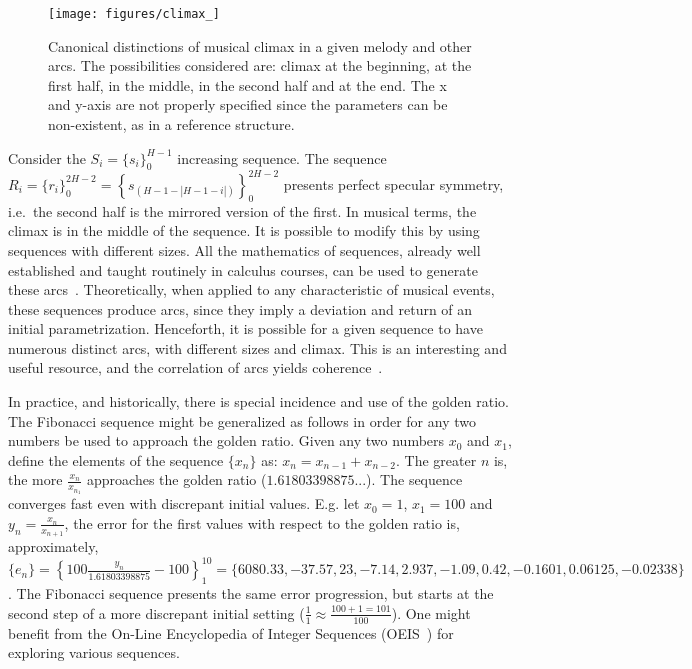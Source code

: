 \begin{figure}
    \centering
        \texttt{[image: figures/climax\_]}
        \caption{Canonical distinctions of musical climax in a given melody and
        other arcs. The possibilities considered are: climax at the beginning, at the first half, in the middle, in the second half and 
        at the end. The x and y-axis are not properly specified since the parameters can be non-existent, as in a reference structure.}
        \label{fig:climax}
\end{figure}

Consider the $S_i=\{s_i\}_0^{H-1}$ increasing sequence. The sequence
$R_i=\{r_i\}_0^{2H -2}=\left\{s_{(H-1-|H-1-i|)}\right\}_0^{2H-2}$
presents perfect specular symmetry, i.e.\ the second half is the
mirrored version of the first. In musical terms, the climax is
in the middle of the sequence. It is possible to modify this
by using sequences with different sizes. All the mathematics of
sequences, already well established and taught routinely in calculus courses, can be used to generate these arcs~\cite{Guidorizzo,Schoenberg}.
Theoretically, when applied to any characteristic of musical events,
these sequences produce arcs, since they imply a deviation and return of an initial parametrization.
Henceforth, it is possible for a given sequence to have
numerous distinct arcs, with different sizes and climax. 
This is an interesting and useful resource, and the correlation of arcs yields coherence~\cite{Salzer}.

In practice, and historically, there is special incidence and use of the golden ratio.
The Fibonacci sequence might be generalized as follows in order for any two numbers be used
to approach the golden ratio.
Given any two numbers $x_0$
and $x_1$, define the elements of the sequence $\{x_n\}$ as: $x_n=x_{n-1}+x_{n-2}$.
The greater $n$ is, the more $\frac{x_{n}}{x_{n_1}}$ approaches the golden ratio
($1.61803398875...$). The sequence converges fast even with discrepant
initial values.
E.g. let $x_0=1$, $x_1=100$ and $y_n=\frac{x_n}{x_{n+1}}$, the error for the first values with
respect to the golden ratio is, approximately, $\{ e_n \}
=\left\{100\frac{y_n}{1.61803398875}-100 \right\}_1^{10}=\{6080.33, -37.57, 23,
-7.14, 2.937, -1.09, 0.42, -0.1601, 0.06125, -0.02338\}$. The Fibonacci sequence
presents the same error progression, but starts at the second step of a more discrepant initial setting
($\frac{1}{1}\approx\frac{100+1 = 101}{100}$).
One might benefit from the On-Line Encyclopedia of Integer Sequences (OEIS~\cite{oeis})
for exploring various sequences.

